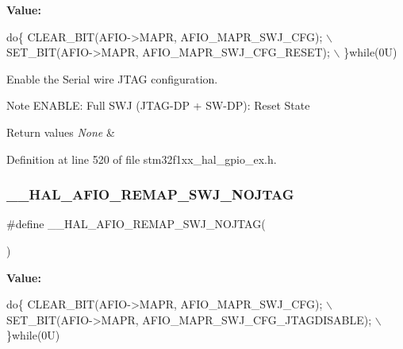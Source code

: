 {\bfseries Value\+:}
\begin{DoxyCode}
\textcolor{keywordflow}{do}\{ CLEAR\_BIT(AFIO->MAPR, AFIO\_MAPR\_SWJ\_CFG);         \(\backslash\)
                                           SET\_BIT(AFIO->MAPR, AFIO\_MAPR\_SWJ\_CFG\_RESET);     \(\backslash\)
                                         \}\textcolor{keywordflow}{while}(0U)
\end{DoxyCode}


Enable the Serial wire J\+T\+AG configuration. 

\begin{DoxyNote}{Note}
E\+N\+A\+B\+LE\+: Full S\+WJ (J\+T\+A\+G-\/\+DP + S\+W-\/\+DP)\+: Reset State 
\end{DoxyNote}

\begin{DoxyRetVals}{Return values}
{\em None} & \\
\hline
\end{DoxyRetVals}


Definition at line 520 of file stm32f1xx\+\_\+hal\+\_\+gpio\+\_\+ex.\+h.

\mbox{\label{group___g_p_i_o_ex___a_f_i_o___a_f___r_e_m_a_p_p_i_n_g_ga31fc766920d61e6bb176500c0a4077e5}} 
\subsubsection{\texorpdfstring{\+\_\+\+\_\+\+H\+A\+L\+\_\+\+A\+F\+I\+O\+\_\+\+R\+E\+M\+A\+P\+\_\+\+S\+W\+J\+\_\+\+N\+O\+J\+T\+AG}{\_\_HAL\_AFIO\_REMAP\_SWJ\_NOJTAG}}
{\footnotesize\ttfamily \#define \+\_\+\+\_\+\+H\+A\+L\+\_\+\+A\+F\+I\+O\+\_\+\+R\+E\+M\+A\+P\+\_\+\+S\+W\+J\+\_\+\+N\+O\+J\+T\+AG(\begin{DoxyParamCaption}{ }\end{DoxyParamCaption})}

{\bfseries Value\+:}
\begin{DoxyCode}
\textcolor{keywordflow}{do}\{ CLEAR\_BIT(AFIO->MAPR, AFIO\_MAPR\_SWJ\_CFG);           \(\backslash\)
                                            SET\_BIT(AFIO->MAPR, AFIO\_MAPR\_SWJ\_CFG\_JTAGDISABLE); \(\backslash\)
                                          \}\textcolor{keywordflow}{while}(0U)
\end{DoxyCode}


